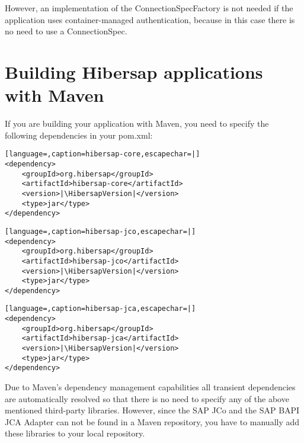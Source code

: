 However, an implementation of the ConnectionSpecFactory is not needed if the application uses container-managed authentication, because in this case there is no need to use a ConnectionSpec.


\section{Building Hibersap applications with Maven}

If you are building your application with Maven, you need to specify the following dependencies in your pom.xml:

\begin{lstlisting}[language=,caption=hibersap-core,escapechar=|]
<dependency>
    <groupId>org.hibersap</groupId>
    <artifactId>hibersap-core</artifactId>
    <version>|\HibersapVersion|</version>
    <type>jar</type>
</dependency>
\end{lstlisting}

\begin{lstlisting}[language=,caption=hibersap-jco,escapechar=|]
<dependency>
    <groupId>org.hibersap</groupId>
    <artifactId>hibersap-jco</artifactId>
    <version>|\HibersapVersion|</version>
    <type>jar</type>
</dependency>
\end{lstlisting}

\begin{lstlisting}[language=,caption=hibersap-jca,escapechar=|]
<dependency>
    <groupId>org.hibersap</groupId>
    <artifactId>hibersap-jca</artifactId>
    <version>|\HibersapVersion|</version>
    <type>jar</type>
</dependency>
\end{lstlisting}

Due to Maven's dependency management capabilities all transient dependencies are automatically resolved so that there is no need to specify any of the above mentioned third-party libraries. However, since the SAP JCo and the SAP BAPI JCA Adapter can not be found in a Maven repository, you have to manually add these libraries to your local repository.
